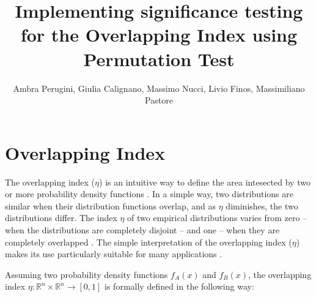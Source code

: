 \documentclass[10pt]{article}\usepackage[]{graphicx}\usepackage[]{xcolor}
\begin{document}
\title{Implementing significance testing for the Overlapping Index using Permutation Test}
\author{Ambra Perugini, Giulia Calignano, Massimo Nucci, Livio Finos, Massimiliano Pastore}

\maketitle





\section{Overlapping Index}

The overlapping index ($\eta$) is an intuitive way to define the area intesected by two or more probability density functions \cite{pastore2019measuring}. In a simple way, two distributions are similar when their distribution functions overlap, and as $\eta$ diminishes, the two distributions differ. The index $\eta$ of two empirical distributions varies from zero -- when the distributions are completely disjoint -- and one -- when they are completely overlapped \cite{pastore2018overlapping}. The simple interpretation of the overlapping index ($\eta$) makes its use particularly suitable for many applications \cite{moravec1988sensor, viola1997alignment, inman1989overlapping, milanovic2002decomposing}.

Assuming two probability density functions $f_A (x)$ and $f_B (x)$, the overlapping index $\eta: \mathbb{R}^n \times \mathbb{R}^n \to [0,1] $ is formally defined in the following way:
\end{document}
